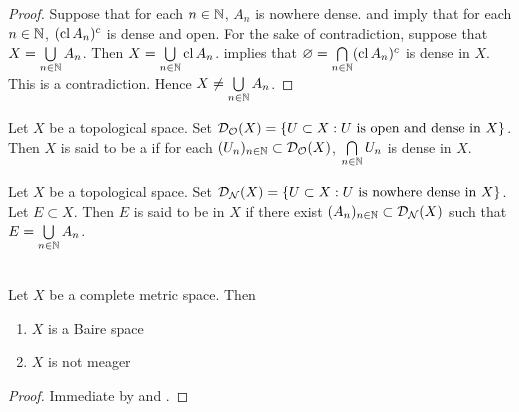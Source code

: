 \documentclass{book}
\begin{document}
\begin{proof}
	Suppose that for each $n \in \mathbb{N}$, $A_n$ is nowhere dense.  and  imply that for each $n \in \mathbb{N}$, $(\operatorname{cl} A_n)^c$ is dense and open. For the sake of contradiction, suppose that $X = \bigcup\limits_{n \in \mathbb{N}} A_n$. Then $X = \bigcup\limits_{n \in \mathbb{N}} \operatorname{cl} A_n$.  implies that  $\varnothing = \bigcap\limits_{n \in \mathbb{N}} (\operatorname{cl} A_n)^c$ is dense in $X$. This is a contradiction. Hence $X \neq \bigcup\limits_{n \in \mathbb{N}} A_n$. 
\end{proof}

\begin{defn} 
	Let $X$ be a topological space. Set $\mathcal{D}_{\mathcal{O}}(X) = \{U \subset X: U \text{ is open and dense in $X$}\}$. Then $X$ is said to be a  if for each $(U_n)_{n \in \mathbb{N}} \subset \mathcal{D}_{\mathcal{O}}(X)$, $\bigcap\limits_{n \in \mathbb{N}} U_n$ is dense in $X$. \\
\end{defn}

\begin{defn} 
	Let $X$ be a topological space. Set $\mathcal{D}_{\mathcal{N}}(X) = \{U \subset X: U \text{ is nowhere dense in $X$}\}$. Let $E \subset X$. Then $E$ is said to be  in $X$ if there exist $(A_n)_{n \in \mathbb{N}} \subset \mathcal{D}_{\mathcal{N}}(X)$ such that $E = \bigcup\limits_{n \in \mathbb{N}} A_n$.
\end{defn}

\begin{thm}  \\
	Let $X$ be a complete metric space. Then 
	\begin{enumerate}
		\item $X$ is a Baire space
		\item $X$ is not meager
	\end{enumerate} 
\end{thm}

\begin{proof}
	Immediate by  and .
\end{proof}
\end{document}

